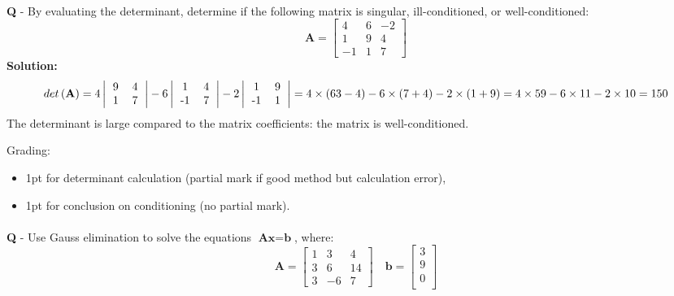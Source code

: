 \documentclass{llncs}
\newcounter{ques}
\newcommand{\myspace}[0]{\vspace*{0.25cm}}
\renewcommand{\question}[1]{\paragraph{}\textbf{Q\theques} - #1\stepcounter{ques} }
\newcommand{\answer}[1]{\color{red}\textbf{Solution:}\\#1\color{black}}
\begin{document}
\myspace

\myspace

\hrulefill

\newpage
\question{By evaluating the determinant, determine if the following matrix is singular, ill-conditioned, or well-conditioned:
$$
\textbf{A}= 
\begin{bmatrix}
4 & 6 & -2 \\
1 & 9 & 4 \\
-1 & 1 & 7
\end{bmatrix}
$$
}
\answer{
$$
det\left( \textbf{A} \right) = 4 \left| 
\begin{tabular}{cc}
9 & 4 \\
1 & 7
\end{tabular}
 \right|
 - 6 \left| \begin{tabular}{cc}
 1 & 4 \\
 -1 & 7
 \end{tabular}
 \right|
 - 2 \left| \begin{tabular}{cc}
 1 & 9 \\
 -1 & 1
 \end{tabular}
 \right|
 = 4 \times (63 - 4) - 6 \times (7 + 4) -2 \times (1 + 9)
 = 4 \times 59 - 6 \times 11 - 2 \times 10 = 150
$$
The determinant is large compared to the matrix coefficients: the matrix
is well-conditioned.

Grading:
\begin{itemize}
\item 1pt for determinant calculation (partial mark if good method but calculation error),
\item 1pt for conclusion on conditioning (no partial mark).
\end{itemize}
}



\newpage
\question{Use Gauss elimination to solve the equations $\textbf{Ax}=\textbf{b}$, where:
$$
\textbf{A}= 
\begin{bmatrix}
1 & 3 & 4 \\
3 & 6 & 14 \\
3 & -6 & 7
\end{bmatrix}
\quad
\textbf{b}= 
\begin{bmatrix}
3  \\
9  \\
0  \\
\end{bmatrix}
$$
}
\end{document}
